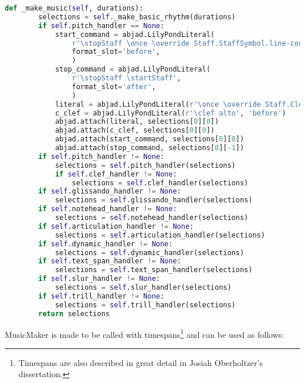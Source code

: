 \begin{lstlisting}[language=Python, caption=MusicMaker source]
    def _make_music(self, durations):
        selections = self._make_basic_rhythm(durations)
        if self.pitch_handler == None:
            start_command = abjad.LilyPondLiteral(
                r'\stopStaff \once \override Staff.StaffSymbol.line-count = #1 \startStaff',
                format_slot='before',
                )
            stop_command = abjad.LilyPondLiteral(
                r'\stopStaff \startStaff',
                format_slot='after',
                )
            literal = abjad.LilyPondLiteral(r'\once \override Staff.Clef.transparent = ##t', 'before')
            c_clef = abjad.LilyPondLiteral(r'\clef alto', 'before')
            abjad.attach(literal, selections[0][0])
            abjad.attach(c_clef, selections[0][0])
            abjad.attach(start_command, selections[0][0])
            abjad.attach(stop_command, selections[0][-1])
        if self.pitch_handler != None:
            selections = self.pitch_handler(selections)
            if self.clef_handler != None:
                selections = self.clef_handler(selections)
        if self.glissando_handler != None:
            selections = self.glissando_handler(selections)
        if self.notehead_handler != None:
            selections = self.notehead_handler(selections)
        if self.articulation_handler != None:
            selections = self.articulation_handler(selections)
        if self.dynamic_handler != None:
            selections = self.dynamic_handler(selections)
        if self.text_span_handler != None:
            selections = self.text_span_handler(selections)
        if self.slur_handler != None:
            selections = self.slur_handler(selections)
        if self.trill_handler != None:
            selections = self.trill_handler(selections)
        return selections
\end{lstlisting}
\doublespace

MusicMaker is made to be called with timespans\footnote{Timespans are also described in great detail in Josiah Oberholtzer's dissertation.\cite[pp. 78--118]{Oberholtzer}} and can be used as follows:


